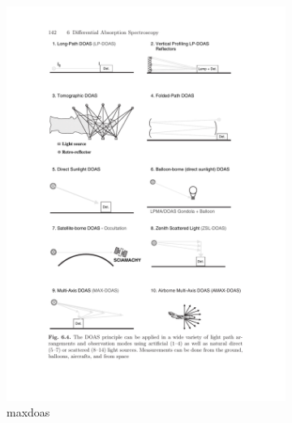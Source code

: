 \begin{figure}[htpb]
\begin{subfigure}[b]{.475\textwidth}
    \end{subfigure}
    \hfill
    \begin{subfigure}[b]{.475\textwidth}
        \centering
        \includegraphics[trim=3cm 5.3cm 12cm
        21.7cm, clip, width=\textwidth]{img/pdf/zenithMaxAMax.pdf}
        \caption{\gls{maxdoas}}
        \label{fig:maxdoas}
    \end{subfigure}
    \hfill
    \begin{subfigure}[b]{.475\textwidth}
        \centering

\end{subfigure}
\end{figure}
